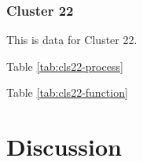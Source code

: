 \subsubsection{Cluster 22}

This is data for Cluster 22.



Table \ref{tab:cls22-process}

Table \ref{tab:cls22-function}
% 


\section{Discussion} \label{chap:4-sec:discussion}



